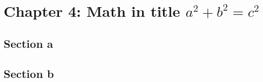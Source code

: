 \chapter{Chapter 4: Math in title \texorpdfstring{$a^2 + b^2 = c^2$}{a2+b2 = c2}}
\section{Section a}
\lipsum[1]
\section{Section b}
\lipsum[2]

